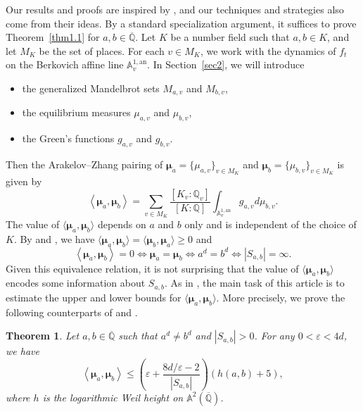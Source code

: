 \documentclass[11pt]{amsart}
\numberwithin{equation}{section}
\theoremstyle{plain}
\newtheorem{thm}{Theorem}[section]
\theoremstyle{definition}
\theoremstyle{remark}
\newcommand{\A}{\mathbb A}
\newcommand{\Q}{\mathbb Q}
\newcommand{\an}{\mathrm{an}}
\renewcommand{\bar}{\overline}
\begin{document}
Our results and proofs are inspired by \cite{DKY2}, and our techniques
and strategies also come from their ideas. By a standard specialization
argument, it suffices to prove Theorem~\ref{thm1.1} for $a,b\in\bar{\Q}$.
Let $K$ be a number field such that $a,b\in K$, and let $M_{K}$
be the set of places. For each $v\in M_{K}$, we work with the dynamics
of $f_{t}$ on the Berkovich affine line $\A_{v}^{1,\an}$.
In Section~\ref{sec2}, we will introduce
\begin{itemize}
\item the generalized Mandelbrot sets $M_{a,v}$ and $M_{b,v}$,
\item the equilibrium measures $\mu_{a,v}$ and $\mu_{b,v}$,
\item the Green's functions $g_{a,v}$ and $g_{b,v}$.
\end{itemize}
Then the Arakelov--Zhang pairing of $\boldsymbol{\mu}_{a}=\{\mu_{a,v}\}_{v\in M_{K}}$
and $\boldsymbol{\mu}_{b}=\{\mu_{b,v}\}_{v\in M_{K}}$ is given by
\[
\left\langle \boldsymbol{\mu}_{a},\boldsymbol{\mu}_{b}\right\rangle =\sum_{v\in M_{K}}\frac{[K_{v}:\Q_{v}]}{[K:\Q]}\int_{\A_{v}^{1,\an}}g_{a,v}d\mu_{b,v}.
\]
The value of $\langle \boldsymbol{\mu}_{a},\boldsymbol{\mu}_{b}\rangle $
depends on $a$ and $b$ only and is independent of the choice of
$K$. By \cite[Propositions 2.6 and 4.5]{FRL} and \cite[Theorems 1.1 and 3.4]{BD1}, we have 
$\langle \boldsymbol{\mu}_{a},\boldsymbol{\mu}_{b}\rangle =\langle \boldsymbol{\mu}_{b},\boldsymbol{\mu}_{a}\rangle \geq0$
and
\[
\left\langle \boldsymbol{\mu}_{a},\boldsymbol{\mu}_{b}\right\rangle =0\Longleftrightarrow\boldsymbol{\mu}_{a}=\boldsymbol{\mu}_{b}\Longleftrightarrow a^{d}=b^{d}\Longleftrightarrow|S_{a,b}|=\infty.
\]
Given this equivalence relation, it is not surprising that the value
of $\langle \boldsymbol{\mu}_{a},\boldsymbol{\mu}_{b}\rangle $
encodes some information about $S_{a,b}$. As in \cite{DKY1, DKY2}, the main task of this article is to estimate the upper
and lower bounds for $\langle \boldsymbol{\mu}_{a},\boldsymbol{\mu}_{b}\rangle $.
More precisely, we prove the following counterparts of \cite[Theorems 1.5, 1.6, and~1.7]{DKY1}
and \cite[Theorems 1.6, 1.7, and 1.9]{DKY2}.

\begin{thm}\label{thm1.2}
Let $a,b\in\bar{\Q}$ such that $a^{d}\neq b^{d}$
and $|S_{a,b}|>0$. For any $0<\varepsilon<4d$, we have
\[
\left\langle \boldsymbol{\mu}_{a},\boldsymbol{\mu}_{b}\right\rangle \leq\left(\varepsilon+\frac{8d/\varepsilon-2}{|S_{a,b}|}\right)(h(a,b)+5),
\]
where $h$ is the logarithmic Weil height on $\A^{2}(\bar{\Q})$.
\end{thm}
\end{document}
